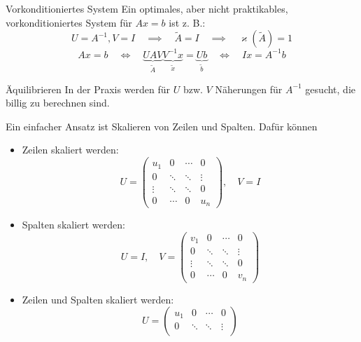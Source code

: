\begin{example}{Vorkonditioniertes System}
    Ein optimales, aber nicht praktikables, vorkonditioniertes System für $Ax = b$ ist z. B.:
    \[
        U = A^{-1}, V = I \quad \implies \quad \tilde{A} = I \quad \implies \quad \varkappa(\tilde{A}) = 1
    \]
    \[
        Ax = b \quad \iff \quad \underbrace{UAV}_{\tilde{A}} \underbrace{V^{-1}x}_{\tilde{x}} = \underbrace{Ub}_{\tilde{b}} \quad \iff \quad I x = A^{-1} b
    \]
\end{example}

\begin{bonus}{Äquilibrieren}
    In der Praxis werden für $U$ bzw. $V$ Näherungen für $A^{-1}$ gesucht, die billig zu berechnen sind.

    Ein einfacher Ansatz ist Skalieren von Zeilen und Spalten.
    Dafür können
    \begin{itemize}
        \item Zeilen skaliert werden:
              \[
                  U =
                  \begin{pmatrix}
                      u_1    & 0      & \cdots & 0      \\
                      0      & \ddots & \ddots & \vdots \\
                      \vdots & \ddots & \ddots & 0      \\
                      0      & \cdots & 0      & u_n
                  \end{pmatrix},
                  \quad V = I
              \]
        \item Spalten skaliert werden:
              \[
                  U = I,
                  \quad V =
                  \begin{pmatrix}
                      v_1    & 0      & \cdots & 0      \\
                      0      & \ddots & \ddots & \vdots \\
                      \vdots & \ddots & \ddots & 0      \\
                      0      & \cdots & 0      & v_n
                  \end{pmatrix}
              \]
        \item Zeilen und Spalten skaliert werden:
              \[
                  U =
                  \begin{pmatrix}
                      u_1    & 0      & \cdots & 0      \\
                      0      & \ddots & \ddots & \vdots \\

\end{pmatrix}\]
\end{itemize}
\end{bonus}
